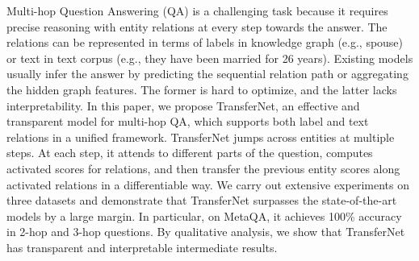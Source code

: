 Multi-hop Question Answering (QA) is a challenging task because it requires precise reasoning with entity relations at every step towards the answer. The relations can be represented in terms of labels in knowledge graph (e.g., spouse) or text in text corpus (e.g., they have been married for 26 years). Existing models usually infer the answer by predicting the sequential relation path or aggregating the hidden graph features. The former is hard to optimize, and the latter lacks interpretability. In this paper, we propose TransferNet, an effective and transparent model for multi-hop QA, which supports both label and text relations in a unified framework. TransferNet jumps across entities at multiple steps. At each step, it attends to different parts of the question, computes activated scores for relations, and then transfer the previous entity scores along activated relations in a differentiable way. We carry out extensive experiments on three datasets and demonstrate that TransferNet surpasses the state-of-the-art models by a large margin. In particular, on MetaQA, it achieves 100\% accuracy in 2-hop and 3-hop questions. By qualitative analysis, we show that TransferNet has transparent and interpretable intermediate results.
